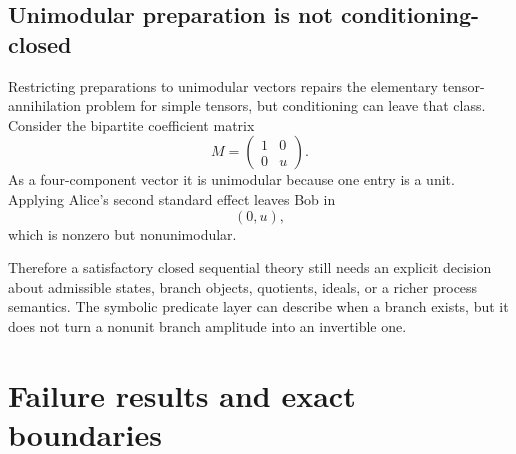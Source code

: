 \documentclass[11pt]{article}
\theoremstyle{definition}
\begin{document}
\subsection{Unimodular preparation is not conditioning-closed}

Restricting preparations to unimodular vectors repairs the elementary tensor-annihilation problem for
simple tensors, but conditioning can leave that class. Consider the bipartite coefficient matrix
\[
M=\begin{pmatrix}1&0\\0&u\end{pmatrix}.
\]
As a four-component vector it is unimodular because one entry is a unit. Applying Alice's second
standard effect leaves Bob in
\[
(0,u),
\]
which is nonzero but nonunimodular.

Therefore a satisfactory closed sequential theory still needs an explicit decision about admissible
states, branch objects, quotients, ideals, or a richer process semantics. The symbolic predicate layer
can describe when a branch exists, but it does not turn a nonunit branch amplitude into an invertible
one.

\section{Failure results and exact boundaries}
\end{document}
